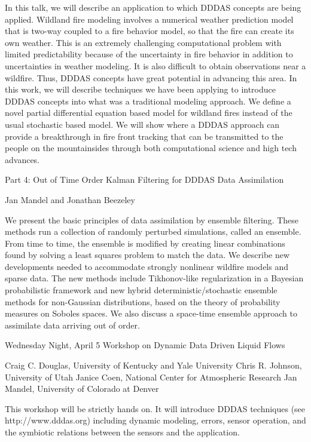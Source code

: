 \documentclass{report}
\begin{document}
In this talk, we will describe an application to which DDDAS concepts are
being applied. Wildland fire modeling involves a numerical weather
prediction model that is two-way coupled to a fire behavior model, so
that the fire can create its own weather. This is an extremely
challenging computational problem with limited predictability because of
the uncertainty in fire behavior in addition to uncertainties in weather
modeling. It is also difficult to obtain observations near a wildfire.
Thus, DDDAS concepts have great potential in advancing this area. In this
work, we will describe techniques we have been applying to introduce
DDDAS concepts into what was a traditional modeling approach. We define a
novel partial differential equation based model for wildland fires
instead of the usual stochastic based model. We will show where a DDDAS
approach can provide a breakthrough in fire front tracking that can be
transmitted to the people on the mountainsides through both computational
science and high tech advances.


Part 4: Out of Time Order Kalman Filtering for DDDAS Data Assimilation

Jan Mandel and Jonathan Beezeley

We present the basic principles of data assimilation by ensemble
filtering. These methods run a collection of randomly perturbed
simulations, called an ensemble. From time to time, the ensemble is
modified by creating linear combinations found by solving a least squares
problem to match the data. We describe new developments needed to
accommodate strongly nonlinear wildfire models and sparse data. The new
methods include Tikhonov-like regularization in a Bayesian probabilistic
framework and new hybrid deterministic/stochastic ensemble methods for
non-Gaussian distributions, based on the theory of probability measures
on Soboles spaces. We also discuss a space-time ensemble approach to
assimilate data arriving out of order.


Wednesday Night, April 5 Workshop on Dynamic Data Driven Liquid Flows

Craig C. Douglas, University of Kentucky and Yale University
Chris R. Johnson, University of Utah
Janice Coen, National Center for Atmospheric Research
Jan Mandel, University of Colorado at Denver

This workshop will be strictly hands on. It will introduce DDDAS
techniques (see http://www.dddas.org) including dynamic modeling, errors,
sensor operation, and the symbiotic relations between the sensors and the
application.
\end{document}
